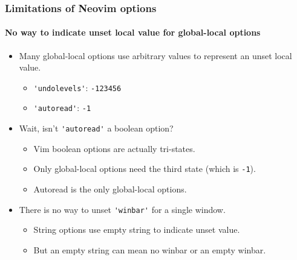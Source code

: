 \documentclass[10pt]{beamer}
\begin{document}
\begin{frame}[fragile]
\frametitle{Limitations of Neovim options}
\framesubtitle{No way to indicate unset local value for global-local options}
\begin{itemize}
    \item Many global-local options use arbitrary values to represent an unset local value.
    \begin{itemize}
        \item \lstinline{'undolevels'}: \lstinline{-123456}
        \item \lstinline{'autoread'}: \lstinline{-1}
    \end{itemize}
    \item Wait, isn't \lstinline{'autoread'} a boolean option?
    \begin{itemize}
        \item Vim boolean options are actually tri-states.
        \item Only global-local options need the third state (which is \lstinline{-1}).
        \item Autoread is the only global-local options.
    \end{itemize}
    \item There is no way to unset \lstinline{'winbar'} for a single window.
    \begin{itemize}
        \item String options use empty string to indicate unset value.
        \item But an empty string can mean no winbar or an empty winbar.
    \end{itemize}
\end{itemize}
\end{frame}
\end{document}
